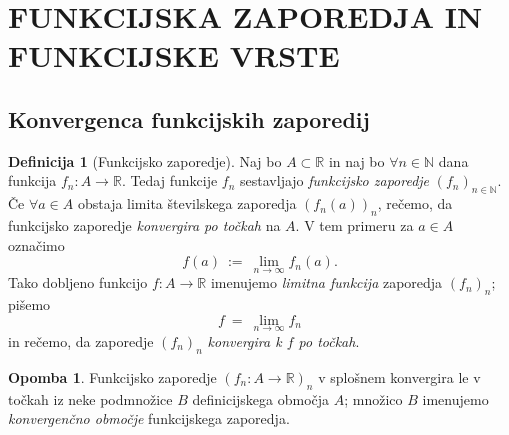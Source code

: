 \documentclass[11pt]{article}
\theoremstyle{definition}
\newtheorem{definicija}{Definicija}[section]
\theoremstyle{definition}
\theoremstyle{definition}
\theoremstyle{theorem}
\newtheorem*{opomba}{Opomba}
\begin{document}
\pagebreak


\section{FUNKCIJSKA ZAPOREDJA IN FUNKCIJSKE VRSTE}
\vspace{0.5cm}


\subsection{Konvergenca funkcijskih zaporedij}
\vspace{0.5cm}

\begin{definicija}[Funkcijsko zaporedje]

Naj bo $A \subset \mathbb{R}$ in naj bo $\forall n \in \mathbb{N}$ dana funkcija $f_n: A \rightarrow \mathbb{R}$. Tedaj funkcije $f_n$ sestavljajo \textit{funkcijsko zaporedje} $(f_n)_{n \in \mathbb{N}}$. \\

Če $\forall a \in A$ obstaja limita številskega zaporedja $(f_n(a))_n$, rečemo, da funkcijsko zaporedje \textit{konvergira po točkah} na $A$. V tem primeru za $a \in A$ označimo 
$$f(a) ~:=~ \lim_{n \rightarrow \infty} f_n(a).$$
Tako dobljeno funkcijo $f: A \rightarrow \mathbb{R}$ imenujemo \textit{limitna funkcija} zaporedja $(f_n)_n$; pišemo 
$$f ~=~ \lim_{n \rightarrow \infty} f_n$$
in rečemo, da zaporedje $(f_n)_n$ \textit{konvergira k $f$ po točkah}.

\end{definicija}
\vspace{0.5cm}

\begin{opomba}

Funkcijsko zaporedje $(f_n: A \rightarrow \mathbb{R})_n$ v splošnem konvergira le v točkah iz neke podmnožice $B$ definicijskega območja $A$; množico $B$ \hbox{imenujemo} \textit{konvergenčno območje} funkcijskega zaporedja.

\end{opomba}
\vspace{0.5cm}
\end{document}
